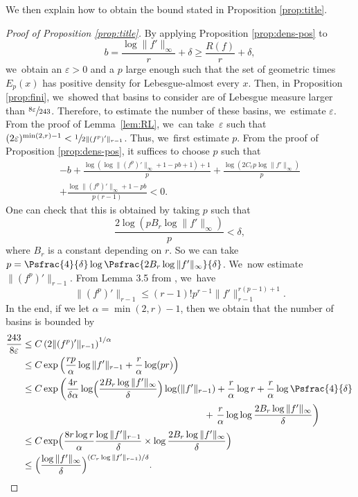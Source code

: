We then explain how to obtain the bound stated in Proposition \ref{prop:title}.\enlargethispage{-2\baselineskip}

\begin{proof}[Proof of Proposition \ref{prop:title}]
By applying Proposition \ref{prop:dens-pos} to
\[
b = \frac{\log \| f' \|_{\infty}}{r} + \delta \geq \frac{R(f)}{r} + \delta,
\]
we~obtain an $\varepsilon > 0$ and a $p$ large enough such that the set of geometric times $E_p(x)$ has positive density for Lebesgue-almost every $x$.
Then, in Proposition \ref{prop:fini}, we~showed that basins to consider are of Lebesgue measure larger than $\sfrac{8 \varepsilon}{243}$.
Therefore, to estimate the number of these basins, we~estimate $\varepsilon$.
From the proof of Lemma~\ref{lem:RL}, we~can take~$\varepsilon$ such that $(2 \varepsilon)^{\min(2,r) - 1} < \sfrac{1}{2 \| (f^p)' \|_{r-1}}$.
Thus, we~first estimate $p$.
From the proof of Proposition \ref{prop:dens-pos}, it suffices to choose $p$ such that
\begin{multline*}
-b + \frac{\log(\log \| (f^p)' \|_{\infty} + 1 - pb+1)+1}{p} + \frac{\log(2 C_r p \log \| f' \|_{\infty})}{p}\\
+ \frac{\log \| (f^p)' \|_{\infty} + 1 - pb}{p(r-1)} < 0.
\end{multline*}
One can check that this is obtained by taking $p$ such that
\[
\frac{2\log(p B_r \log \| f' \|_{\infty})}{p} < \delta,
\]
where $B_r$ is a constant depending on $r$.
So we can take $p = \Psfrac{4}{\delta} \log \Psfrac{2 B_r \log \| f' \|_{\infty}}{\delta}$. We~now estimate $\| (f^p)' \|_{r-1}$.
From Lemma 3.5 from \cite{MR3384516}, we~have
\[
\| (f^p)' \|_{r-1} \leq (r-1)! p^{r-1} \| f' \|_{r-1}^{r(p-1) +1 }.
\]
In the end, if we let $\alpha = \min(2,r)-1$, then we obtain that the number of basins is bounded by
\begin{align*}
\frac{243}{8 \varepsilon} &\leq C \left (2 \| (f^p)' \|_{r-1} \right)^{1/\alpha}\\
&\leq C \exp \left (\frac{rp}{\alpha} \log \| f' \|_{r-1} + \frac{r}{\alpha} \log (pr) \right)\\
&\leq C \exp \left (\frac{4r}{\delta \alpha} \log \Bigl (\frac{2 B_r \log \| f' \|_{\infty}}{\delta} \Bigr) \log (\| f' \|_{r-1}) + \frac{r}{\alpha} \log r + \frac{r}{\alpha} \log \Psfrac {4}{\delta} \right.\\
&\hspace{6.8cm}+ \left. \frac{r}{\alpha} \log \log \frac{2 B_r \log \| f' \|_{\infty}}{\delta} \right)\\
&\leq C \exp \Bigl (\frac{8 r \log r}{\alpha} \frac{\log \| f' \|_{r-1}}{\delta} \times \log \frac{2 B_r \log \| f' \|_{\infty}}{\delta} \Bigr)\\
&\leq \Bigl (\frac{\log \| f' \|_{\infty}}{\delta} \Bigr)^{ (C_r \log \| f' \|_{r-1}) / \delta }.\qedhere
\end{align*}
\end{proof}

